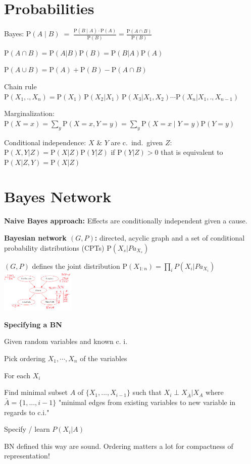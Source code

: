 \documentclass[a4paper, 11pt]{scrartcl}
\newcommand{\uP}{\mathrm P}
\begin{document}
	\begin{multicols*}{3}
		
		\section{Probabilities}
		\begin{compactitem}[]
			\item[] Bayes: $\uP(A\mid B) \; = \; \frac {\uP(B\mid A) \cdot \uP(A)} {\uP(B)} = \frac{\uP(A\cap B)}{\uP(B)}$
			\item[] $\uP(A\cap B) = \uP(A|B)\uP(B) = \uP(B|A)\uP(A)$
			\item[] $\uP(A\cup B)=\uP(A)+\uP(B)-{{\uP(A\cap B)}}$
			\item[] Chain rule $\uP (X_{1},.,X_{n})=\uP(X_{1})\,\uP(X_{2}| X_{1})\,\uP(X_{3}| X_{1},X_{2}) \cdots \uP(X_{n} | X_{1},.,X_{n-1})$
			\item[] Marginalization: $ \uP(X=x)=\sum _{y}\uP(X=x,Y=y)=\sum _{y}\uP(X=x\mid Y=y)\uP(Y=y)$
			\item[] Conditional independence: $X$ \& $Y$ are c.\ ind.\ given $Z$: $\uP(X, Y| Z) = \uP(X|Z) \uP(Y|Z)$ if $\uP(Y|Z) > 0$ that is equivalent to $\uP(X|Z,Y) = \uP(X | Z)$
		\end{compactitem}
	
	
		\section{Bayes Network}
		\textbf{Naive Bayes approach:} Effects are conditionally independent given a cause.
		
		\textbf{Bayesian network $(G,P)$:} directed, acyclic graph and a set of conditional probability distributions (CPTs) $\uP(X_s| Pa_{X_{s}})$
		
		 $(G,P)$ defines the joint distribution $\mathrm {P} (X_{1:n}) = \prod_{i} P(X_i| Pa_{X_{i}})$  
		\includegraphics[height=2cm]{img/pai1.png}
		 
		\textbf{Specifying a BN}
		\begin{compactitem}
			\item Given random variables and known c. i.
			\item Pick ordering $X_1, \cdots, X_n$ of the variables
			\item For each $X_i$
			\begin{compactenum}
				\item Find minimal subset $A$ of $\{X_1,...,X_{i-1}\}$ such that $X_i \perp X_{\bar{A}} | X_A$ where $\bar{A} = \{1,...,i-1\}$ "minimal edges from existing variables to new variable in regards to c.i."
				\item Specify / learn $P(X_i|A)$
			\end{compactenum}
		\end{compactitem}
		BN defined this way are sound. Ordering matters a lot for compactness of representation!
		

\end{multicols*}
\end{document}
